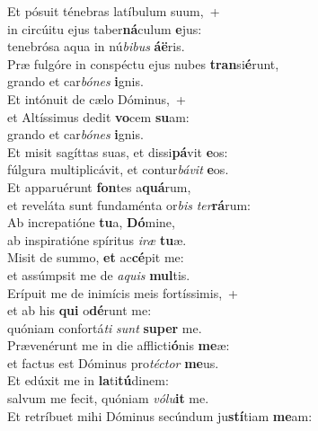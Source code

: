 \oddverse Et pósuit ténebras latíbulum suum,~+\\
\oddverse  in circúitu ejus taber\textbf{ná}culum \textbf{e}jus:~\*\\
\oddverse tenebrósa aqua in nú\textit{bi}\textit{bus} \textbf{á}\textbf{ë}ris.\\
\evenverse Præ fulgóre in conspéctu ejus nubes \textbf{tran}si\textbf{é}runt,~\*\\
\evenverse grando et car\textit{bó}\textit{nes} \textbf{i}gnis.\\
\oddverse Et intónuit de cælo Dóminus,~+\\
\oddverse  et Altíssimus dedit \textbf{vo}cem \textbf{su}am:~\*\\
\oddverse grando et car\textit{bó}\textit{nes} \textbf{i}gnis.\\
\evenverse Et misit sagíttas suas, et dissi\textbf{pá}vit \textbf{e}os:~\*\\
\evenverse fúlgura multiplicávit, et contur\textit{bá}\textit{vit} \textbf{e}os.\\
\oddverse Et apparuérunt \textbf{fon}tes a\textbf{quá}rum,~\*\\
\oddverse et reveláta sunt fundaménta or\textit{bis} \textit{ter}\textbf{rá}rum:\\
\evenverse Ab increpatióne \textbf{tu}a, \textbf{Dó}mine,~\*\\
\evenverse ab inspiratióne spíritus \textit{i}\textit{ræ} \textbf{tu}æ.\\
\oddverse Misit de summo, \textbf{et} ac\textbf{cé}pit me:~\*\\
\oddverse et assúmpsit me de \textit{a}\textit{quis} \textbf{mul}tis.\\
\evenverse Erípuit me de inimícis meis fortíssimis,~+\\
\evenverse  et ab his \textbf{qui} o\textbf{dé}runt me:~\*\\
\evenverse quóniam confortá\textit{ti} \textit{sunt} \textbf{su}\textbf{per} me.\\
\oddverse Prævenérunt me in die afflicti\textbf{ó}nis \textbf{me}æ:~\*\\
\oddverse et factus est Dóminus pro\textit{té}\textit{ctor} \textbf{me}us.\\
\evenverse Et edúxit me in \textbf{la}ti\textbf{tú}dinem:~\*\\
\evenverse salvum me fecit, quóniam \textit{vó}\textit{lu}\textbf{it} me.\\
\oddverse Et retríbuet mihi Dóminus secúndum ju\textbf{stí}tiam \textbf{me}am:~\*\\

